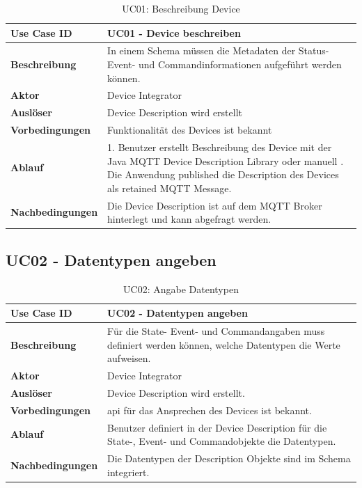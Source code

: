 \begin{table}[H]
\begin{tabularx}{\textwidth}{|l|X|}

 \hline
 {\bf Use Case ID }    & UC01 - Device beschreiben \\  \hline
 {\bf Beschreibung }   & In einem Schema müssen die Metadaten der Status- Event- und Commandinformationen aufgeführt werden können.
 \\ \hline
 {\bf Aktor }          & Device Integrator \\ \hline
 {\bf Auslöser }       & Device Description wird erstellt \\ \hline
 {\bf Vorbedingungen } & Funktionalität des Devices ist bekannt \\ \hline
 {\bf Ablauf }         & 
     1. Benutzer erstellt Beschreibung des Device mit der Java MQTT Device Description Library oder manuell \newline                                             
     2. Die Anwendung published die Description des Devices als retained MQTT Message.  \\ \hline
 {\bf Nachbedingungen} & Die Device Description ist auf dem MQTT Broker hinterlegt und kann abgefragt werden. \\ \hline
  
\end{tabularx}
\caption{UC01: Beschreibung Device}
\end{table}

\subsection{UC02 - Datentypen angeben}

\begin{table}[H]
\begin{tabularx}{\textwidth}{|l|X|}

 \hline
 {\bf Use Case ID }    & UC02 - Datentypen angeben \\  \hline
 {\bf Beschreibung }   & Für die State- Event- und Commandangaben muss definiert werden können, welche Datentypen die Werte aufweisen. \\ \hline
 {\bf Aktor }          & Device Integrator \\ \hline
 {\bf Auslöser }       & Device Description wird erstellt. \\ \hline
 {\bf Vorbedingungen } & \gls{api} für das Ansprechen des Devices ist bekannt. \\ \hline
 {\bf Ablauf }         & Benutzer definiert in der Device Description für die State-, Event- und Commandobjekte die Datentypen. \\ \hline
 {\bf Nachbedingungen} &  Die Datentypen der Description Objekte sind im Schema integriert. \\ \hline
  
\end{tabularx}
\caption{UC02: Angabe Datentypen}
\end{table}

